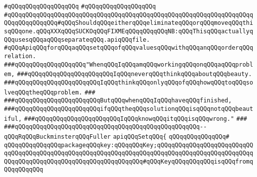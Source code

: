 \verb|#qQQqqQQqqQQqqQQqqQQq|\newline
\verb|#qQQqqQQqqQQqqQQqqQQq|\newline
\verb|#qQQqqQQqqQQqqQQqqQQq|\verb|qQQqqQQqqQQqqQQqqQQqqQQqqQQqqQQqqQQqqQQqqQQqqQQqqQQqqQQqqQQqqQQq#qQQqShouldqQQqeitherqQQqeliminateqQQqorqQQqmoveqQQqthisqQQqone.qQQqXXXqQQqSUCKOqQQqFIXMEqQQqqQQqqQQqNB:qQQqThisqQQqactuallyqQQqusesqQQqaqQQqseparateqQQq.apiqQQqfile.|\newline
\newline
\newline
\newline
\newline
\verb|#qQQqApiqQQqforqQQqaqQQqsetqQQqofqQQqvaluesqQQqwithqQQqanqQQqorderqQQqrelation.|\newline
\newline
\newline
\newline
\verb|###qQQqqQQqqQQqqQQqqQQq"WhenqQQqIqQQqamqQQqworkingqQQqonqQQqaqQQqproblem,|\newline
\verb|###qQQqqQQqqQQqqQQqqQQqqQQqIqQQqneverqQQqthinkqQQqaboutqQQqbeauty.|\newline
\verb|###qQQqqQQqqQQqqQQqqQQqqQQqIqQQqthinkqQQqonlyqQQqofqQQqhowqQQqtoqQQqsolveqQQqtheqQQqproblem.|\newline
\verb|###|\newline
\verb|###qQQqqQQqqQQqqQQqqQQqqQQqButqQQqwhenqQQqIqQQqhaveqQQqfinished,|\newline
\verb|###qQQqqQQqqQQqqQQqqQQqqQQqifqQQqtheqQQqsolutionqQQqisqQQqnotqQQqbeautiful,|\newline
\verb|###qQQqqQQqqQQqqQQqqQQqqQQqIqQQqknowqQQqitqQQqisqQQqwrong."|\newline
\verb|###|\newline
\verb|###qQQqqQQqqQQqqQQqqQQqqQQqqQQqqQQqqQQqqQQqqQQqqQQqqQQq--qQQqRqQQqBuckminsterqQQqFuller|\newline
\newline
\newline
\verb|apiqQQqSetqQQq{|\newline
\verb|qQQqqQQqqQQqqQQq#|\newline
\verb|qQQqqQQqqQQqqQQqpackageqQQqkey:qQQqqQQqKey;qQQqqQQqqQQqqQQqqQQqqQQqqQQqqQQqqQQqqQQqqQQqqQQqqQQqqQQqqQQqqQQqqQQqqQQqqQQqqQQqqQQqqQQqqQQqqQQqqQQqqQQqqQQqqQQqqQQqqQQqqQQqqQQqqQQqqQQq#qQQqKeyqQQqqQQqqQQqisqQQqfromqQQqqQQqqQQq|\newline
